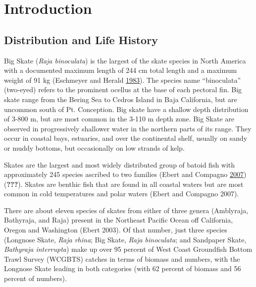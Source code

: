 \documentclass[12pt,]{article}
\begin{document}
\FloatBarrier

\newpage
\renewcommand{\thefigure}{\arabic{figure}}
\renewcommand{\thetable}{\arabic{table}}
\setcounter{figure}{0}
\setcounter{table}{0}

\newpage
\renewcommand{\thefigure}{\arabic{figure}}
\renewcommand{\thetable}{\arabic{table}}
\setcounter{figure}{0}
\setcounter{table}{0}

\hypertarget{introduction}{%
\section{Introduction}\label{introduction}}

\hypertarget{distribution-and-life-history}{%
\subsection{Distribution and Life
History}\label{distribution-and-life-history}}

Big Skate (\emph{Raja binoculata}) is the largest of the skate species
in North America with a documented maximum length of 244 cm total length
and a maximum weight of 91 kg (Eschmeyer and Herald
\protect\hyperlink{ref-Eschmeyer1983}{1983}). The species name
``binoculata'' (two-eyed) refers to the prominent ocellus at the base of
each pectoral fin. Big skate range from the Bering Sea to Cedros Island
in Baja California, but are uncommon south of Pt. Conception. Big skate
have a shallow depth distribution of 3-800 m, but are most common in the
3-110 m depth zone. Big Skate are observed in progressively shallower
water in the northern parts of its range. They occur in coastal bays,
estuaries, and over the continental shelf, usually on sandy or muddy
bottoms, but occasionally on low strands of kelp.

Skates are the largest and most widely distributed group of batoid fish
with approximately 245 species ascribed to two families (Ebert and
Compagno
\protect\hyperlink{ref-Ebert2007biodiversity}{2007})({\textbf{???}}).
Skates are benthic fish that are found in all coastal waters but are
most common in cold temperatures and polar waters (Ebert and Compagno
2007).

There are about eleven species of skates from either of three genera
(Amblyraja, Bathyraja, and Raja) present in the Northeast Pacific Ocean
off California, Oregon and Washington (Ebert 2003). Of that number, just
three species (Longnose Skate, \emph{Raja rhina}; Big Skate, \emph{Raja
binoculata}; and Sandpaper Skate, \emph{Bathyraja interrupta}) make up
over 95 percent of West Coast Groundfish Bottom Trawl Survey (WCGBTS)
catches in terms of biomass and numbers, with the Longnose Skate leading
in both categories (with 62 percent of biomass and 56 percent of
numbers).
\end{document}
